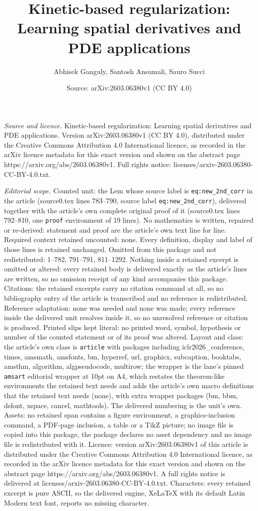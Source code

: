 \documentclass[10pt,a4paper]{amsart}
\title[Kinetic-based regularization: Learning spatial derivatives a]{Kinetic-based regularization: Learning spatial derivatives and PDE applications}
\author{Abhisek Ganguly, Santosh Ansumali, Sauro Succi}
\date{Source: arXiv:2603.06380v1 (CC BY 4.0)}
\begin{document}
\maketitle

\noindent\emph{Source and licence.} Kinetic-based regularization: Learning spatial derivatives and PDE applications. Version arXiv:2603.06380v1 (CC BY 4.0), distributed under the Creative Commons Attribution 4.0 International licence, as recorded in the arXiv licence metadata for this exact version and shown on the abstract page https://arxiv.org/abs/2603.06380v1. Full rights notice: licenses/arxiv-2603.06380-CC-BY-4.0.txt.\par\smallskip

\noindent\textit{Editorial scope.} Counted unit: the Lem whose source label is \texttt{eq:new\_2nd\_corr} in the article (source0.tex lines 783--790, source label \texttt{eq:new\_2nd\_corr}), delivered together with the article's own complete original proof of it (source0.tex lines 792--810, one \texttt{proof} environment of 19 lines). No mathematics is written, repaired or re-derived: statement and proof are the article's own text line for line. Required context retained uncounted: none. Every definition, display and label of those lines is retained unchanged. Omitted from this package and not redistributed: 1--782, 791--791, 811--1292. Nothing inside a retained excerpt is omitted or altered: every retained body is delivered exactly as the article's lines are written, so no omission receipt of any kind accompanies this package. Citations: the retained excerpts carry no citation command at all, so no bibliography entry of the article is transcribed and no reference is redistributed. Reference adaptation: none was needed and none was made; every reference inside the delivered unit resolves inside it, so no unresolved reference or citation is produced. Printed slips kept literal: no printed word, symbol, hypothesis or number of the counted statement or of its proof was altered. Layout and class: the article's own class is \texttt{article} with packages including iclr2026\_conference, times, amsmath, amsfonts, bm, hyperref, url, graphicx, subcaption, booktabs, amsthm, algorithm, algpseudocode, multirow; the wrapper is the lane's pinned \texttt{amsart} editorial wrapper at 10pt on A4, which restates the theorem-like environments the retained text needs and adds the article's own macro definitions that the retained text needs (none), with extra wrapper packages (bm, bbm, dsfont, xspace, cancel, mathtools). The delivered numbering is the unit's own. Assets: no retained span contains a figure environment, a graphics-inclusion command, a PDF-page inclusion, a table or a TikZ picture; no image file is copied into this package, the package declares no asset dependency and no image file is redistributed with it. Licence: version arXiv:2603.06380v1 of this article is distributed under the Creative Commons Attribution 4.0 International licence, as recorded in the arXiv licence metadata for this exact version and shown on the abstract page https://arxiv.org/abs/2603.06380v1. A full rights notice is delivered at licenses/arxiv-2603.06380-CC-BY-4.0.txt. Characters: every retained excerpt is pure ASCII, so the delivered engine, XeLaTeX with its default Latin Modern text font, reports no missing character.
\end{document}
